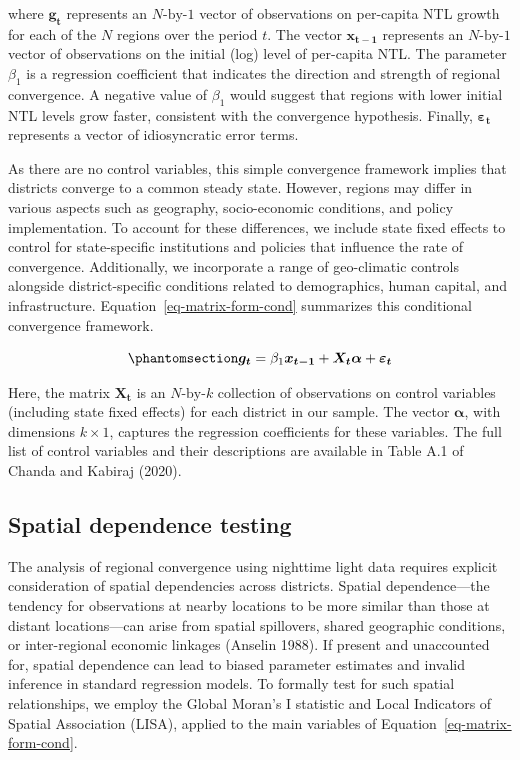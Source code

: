 \documentclass[
  letterpaper,
  DIV=11,
  numbers=noendperiod]{scrartcl}
\begin{document}
where \(\boldsymbol{g_t}\) represents an \(N\text{-by-}1\) vector of
observations on per-capita NTL growth for each of the \(N\) regions over
the period \(t\). The vector \(\boldsymbol{x_{t-1}}\) represents an
\(N\text{-by-}1\) vector of observations on the initial (log) level of
per-capita NTL. The parameter \(\beta_1\) is a regression coefficient
that indicates the direction and strength of regional convergence. A
negative value of \(\beta_1\) would suggest that regions with lower
initial NTL levels grow faster, consistent with the convergence
hypothesis. Finally, \(\boldsymbol{\varepsilon_t}\) represents a vector
of idiosyncratic error terms.

As there are no control variables, this simple convergence framework
implies that districts converge to a common steady state. However,
regions may differ in various aspects such as geography, socio-economic
conditions, and policy implementation. To account for these differences,
we include state fixed effects to control for state-specific
institutions and policies that influence the rate of convergence.
Additionally, we incorporate a range of geo-climatic controls alongside
district-specific conditions related to demographics, human capital, and
infrastructure. Equation~\ref{eq-matrix-form-cond} summarizes this
conditional convergence framework.

\begin{equation}\phantomsection\label{eq-matrix-form-cond}{
\boldsymbol{g_t} =  \beta_1 \boldsymbol{x_{t-1}} + \boldsymbol{X_t} \boldsymbol{\alpha}  + \boldsymbol{\varepsilon_t}
}\end{equation}

Here, the matrix \(\boldsymbol{X_t}\) is an \(N\text{-by-}k\) collection
of observations on control variables (including state fixed effects) for
each district in our sample. The vector \(\boldsymbol{\alpha}\), with
dimensions \(k \times 1\), captures the regression coefficients for
these variables. The full list of control variables and their
descriptions are available in Table A.1 of Chanda and Kabiraj (2020).

\subsection{Spatial dependence
testing}\label{spatial-dependence-testing}

The analysis of regional convergence using nighttime light data requires
explicit consideration of spatial dependencies across districts. Spatial
dependence---the tendency for observations at nearby locations to be
more similar than those at distant locations---can arise from spatial
spillovers, shared geographic conditions, or inter-regional economic
linkages (Anselin 1988). If present and unaccounted for, spatial
dependence can lead to biased parameter estimates and invalid inference
in standard regression models. To formally test for such spatial
relationships, we employ the Global Moran's I statistic and Local
Indicators of Spatial Association (LISA), applied to the main variables
of Equation~\ref{eq-matrix-form-cond}.
\end{document}
